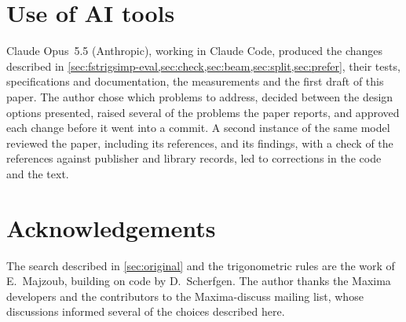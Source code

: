 \documentclass[11pt]{amsart}
\theoremstyle{definition}
\theoremstyle{remark}
\begin{document}
\section*{Use of AI tools}

Claude Opus~5.5 (Anthropic), working in Claude Code, produced the changes
described in
\cref{sec:fstrigsimp-eval,sec:check,sec:beam,sec:split,sec:prefer}, their
tests, specifications and documentation, the measurements and the first
draft of this paper. The author chose which
problems to address, decided between the design options presented, raised
several of the problems the paper reports, and approved each change before
it went into a commit. A second instance of the same model reviewed the
paper, including its references, and its findings, with a check of the
references against publisher and library records, led to corrections in
the code and the text.

\section*{Acknowledgements}

The search described in \cref{sec:original} and the trigonometric rules are
the work of E.~Majzoub, building on code by D.~Scherfgen. The author thanks
the Maxima developers and the contributors to the Maxima-discuss mailing
list, whose discussions informed several of the choices described here.
\end{document}
